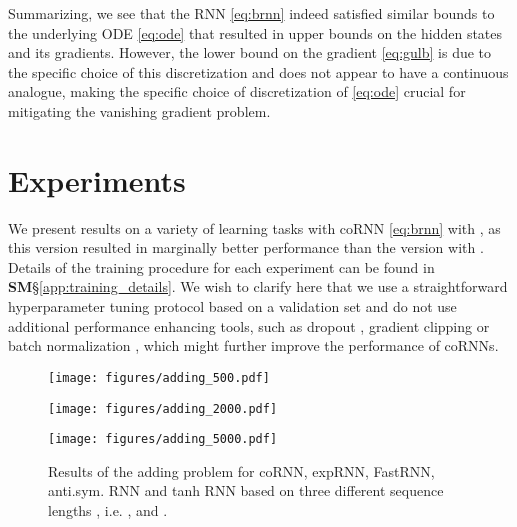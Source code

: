 \documentclass{article} \usepackage{iclr2021_conference,times}
\begin{document}
Summarizing, we see that the RNN \eqref{eq:brnn} indeed satisfied similar bounds to the underlying ODE \eqref{eq:ode} that resulted in upper bounds on the hidden states and its gradients. However, the lower bound on the gradient \eqref{eq:gulb} is due to the specific choice of this discretization and does not appear to have a continuous analogue, making the specific choice of discretization of \eqref{eq:ode} crucial for mitigating the vanishing gradient problem. 
\section{Experiments}
We present results on a variety of learning tasks with coRNN \eqref{eq:brnn} with , as this version resulted in marginally better performance than the version with . Details of the training procedure for each experiment can be found in {\bf SM}\S\ref{app:training_details}. We wish to clarify here that we use a straightforward hyperparameter tuning protocol based on a validation set and do not use additional performance enhancing tools, such as dropout \citep{dropout}, gradient clipping \citep{vanish_grad} or batch normalization \citep{batch_norm}, which might further improve the performance of coRNNs. 

\begin{figure}[ht!]
\begin{minipage}{.33\textwidth}
\texttt{[image: figures/adding\_500.pdf]}
\end{minipage}\begin{minipage}{.33\textwidth}
\texttt{[image: figures/adding\_2000.pdf]}
\end{minipage}\begin{minipage}{.33\textwidth}
\texttt{[image: figures/adding\_5000.pdf]}
\end{minipage}
\caption{Results of the adding problem for coRNN, expRNN, FastRNN, anti.sym. RNN and tanh RNN based on three different sequence lengths , i.e. ,  and .}
\label{fig:adding_results}
\end{figure}
\end{document}
